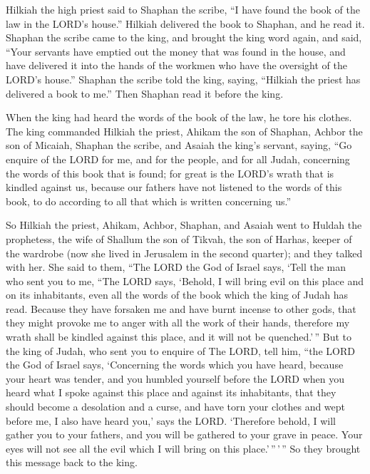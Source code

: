  Hilkiah the high priest said to Shaphan the scribe, ``I
have found the book of the law in the LORD's house.'' Hilkiah delivered
the book to Shaphan, and he read it.  Shaphan the scribe
came to the king, and brought the king word again, and said, ``Your
servants have emptied out the money that was found in the house, and
have delivered it into the hands of the workmen who have the oversight
of the LORD's house.''  Shaphan the scribe told the king,
saying, ``Hilkiah the priest has delivered a book to me.'' Then Shaphan
read it before the king.

 When the king had heard the words of the book of the
law, he tore his clothes.  The king commanded Hilkiah the
priest, Ahikam the son of Shaphan, Achbor the son of Micaiah, Shaphan
the scribe, and Asaiah the king's servant, saying,  ``Go
enquire of the LORD for me, and for the people, and for all Judah,
concerning the words of this book that is found; for great is the LORD's
wrath that is kindled against us, because our fathers have not listened
to the words of this book, to do according to all that which is written
concerning us.''

 So Hilkiah the priest, Ahikam, Achbor, Shaphan, and
Asaiah went to Huldah the prophetess, the wife of Shallum the son of
Tikvah, the son of Harhas, keeper of the wardrobe (now she lived in
Jerusalem in the second quarter); and they talked with her.
 She said to them, ``The LORD the God of Israel says,
`Tell the man who sent you to me,  ``The LORD says,
`Behold, I will bring evil on this place and on its inhabitants, even
all the words of the book which the king of Judah has read.
 Because they have forsaken me and have burnt incense to
other gods, that they might provoke me to anger with all the work of
their hands, therefore my wrath shall be kindled against this place, and
it will not be quenched.'\,''  But to the king of Judah,
who sent you to enquire of The LORD, tell him, ``the LORD the God of
Israel says, `Concerning the words which you have heard, 
because your heart was tender, and you humbled yourself before the LORD
when you heard what I spoke against this place and against its
inhabitants, that they should become a desolation and a curse, and have
torn your clothes and wept before me, I also have heard you,' says the
LORD.  `Therefore behold, I will gather you to your
fathers, and you will be gathered to your grave in peace. Your eyes will
not see all the evil which I will bring on this place.'\,''\,'\,'' So
they brought this message back to the king.

